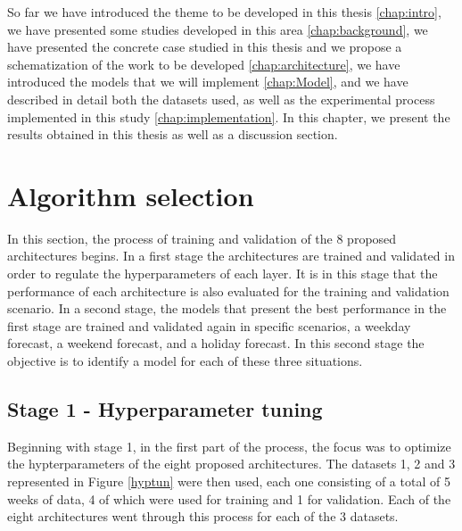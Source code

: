\cleardoublepage
\label{chap:results}

So far we have introduced the theme to be developed in this thesis \ref{chap:intro}, we have presented some studies developed in this area \ref{chap:background}, we have presented the concrete case studied in this thesis and we propose a schematization of the work to be developed \ref{chap:architecture}, we have introduced the models that we will implement \ref{chap:Model}, and we have described in detail both the datasets used, as well as the experimental process implemented in this study \ref{chap:implementation}. In this chapter, we present the results obtained in this thesis as well as a discussion section.


\section{Algorithm selection} \label{chap5:framework}

In this section, the process of training and validation of the 8 proposed architectures begins. In a first stage the architectures are trained and validated in order to regulate the hyperparameters of each layer. It is in this stage that the performance of each architecture is also evaluated for the training and validation scenario. In a second stage, the models that present the best performance in the first stage are trained and validated again in specific scenarios, a weekday forecast, a weekend forecast, and a holiday forecast. In this second stage the objective is to identify a model for each of these three situations.  


\subsection{Stage 1 - Hyperparameter tuning}\label{sec:part1}
Beginning with stage 1, in the first part of the process, the focus was to optimize the hypterparameters of the eight proposed architectures. The datasets 1, 2 and 3 represented in Figure \ref{hyptun} were then used, each one consisting of a total of 5 weeks of data, 4 of which were used for training and 1 for validation. Each of the eight architectures went through this process for each of the 3 datasets.  


